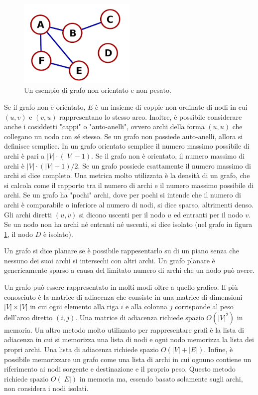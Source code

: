 \documentclass[12pt,a4paper,oneside]{book}
\begin{document}
	\begin{figure}
		\centering
		\includegraphics[width=0.5\textwidth]{grafo-esempio}
		\caption{Un esempio di grafo non orientato e non pesato.}
		\label{fig:grafo-esempio}
	\end{figure}

	Se il grafo non è orientato, $E$ è un insieme di coppie non ordinate di nodi in cui $(u,v)$ e $(v,u)$ rappresentano lo stesso arco.	Inoltre, è possibile considerare anche i cosiddetti "cappi" o "auto-anelli", ovvero archi della forma $(u,u)$ che collegano un nodo con sé stesso. Se un grafo non possiede auto-anelli, allora si definisce semplice. In un grafo orientato semplice il numero massimo possibile di archi è pari a $|V|\cdot(|V|-1)$. Se il grafo non è orientato, il numero massimo di archi è $|V|\cdot(|V|-1)/2$. Se un grafo possiede esattamente il numero massimo di archi si dice completo. Una metrica molto utilizzata è la densità di un grafo, che si calcola come il rapporto tra il numero di archi e il numero massimo possibile di archi. Se un grafo ha "pochi" archi, dove per pochi si intende che il numero di archi è comparabile o inferiore al numero di nodi, si dice sparso, altrimenti denso. Gli archi diretti $(u,v)$ si dicono uscenti per il nodo $u$ ed entranti per il nodo $v$. Se un nodo non ha archi né entranti né uscenti, si dice isolato (nel grafo in figura \ref{fig:grafo-esempio}, il nodo $D$ è isolato).
	
	Un grafo si dice planare se è possibile rappesentarlo su di un piano senza che nessuno dei suoi archi si intersechi con altri archi. Un grafo planare è genericamente sparso a causa del limitato numero di archi che un nodo può avere.
	
	Un grafo può essere rappresentato in molti modi oltre a quello grafico. Il più conosciuto è la matrice di adiacenza che consiste in una matrice di dimensioni $|V|\times |V|$ in cui ogni elemento alla riga $i$ e alla colonna $j$ corrisponde al peso dell'arco diretto $(i,j)$. Una matrice di adiacenza richiede spazio $O(|V|^2)$ in memoria. Un altro metodo molto utilizzato per rappresentare grafi è la lista di adiacenza in cui si memorizza una lista di nodi e ogni nodo memorizza la lista dei propri archi. Una lista di adiacenza richiede spazio $O(|V|+|E|)$. Infine, è possibile memorizzare un grafo come una lista di archi in cui ognuno contiene un riferimento ai nodi sorgente e destinazione e il proprio peso. Questo metodo richiede spazio $O(|E|)$ in memoria ma, essendo basato solamente sugli archi, non considera i nodi isolati.
	
\end{document}
